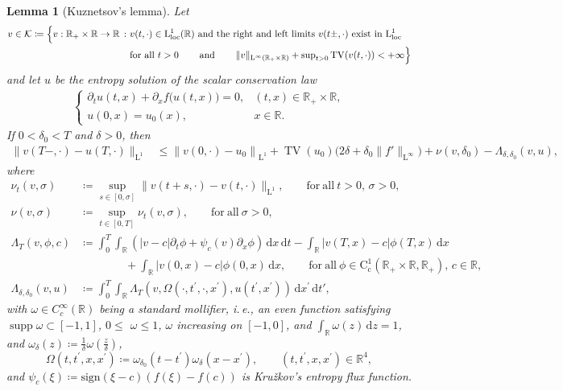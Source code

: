 \documentclass[10pt]{amsart}
\theoremstyle{plain}
\newtheorem{lemma}{Lemma}[section]
\theoremstyle{definition}
\numberwithin{equation}{section}
\newcommand{\R}{\mathbb{R}}
\newcommand{\sgn}[1]{\mathrm{sign}\left(#1\right)}
\newcommand{\pt}{\partial_t}
\newcommand{\px}{\partial_x }
\begin{document}
\begin{lemma}[Kuznetsov's lemma] \label{lm:kut} 
Let 
\begin{align*} v \in \mathcal K \coloneqq \Big\{ v: \R_+\times \R \to \R \, : \ & v(t,\cdot) \in \mathrm{L}^1_{\mathrm{loc}}(\R) \textnormal{ and the right and left limits $v(t \pm, \cdot)$ exist in $\mathrm L^1_{\mathrm{loc}}$} \\ 
&\textnormal{for all $t>0$ \quad\ \, and \quad\ \,  } \|v\|_{\mathrm{L}^\infty(\R_+\times \R)} + \sup\nolimits_{t>0} \mathrm{TV}(v(t,\cdot)) < +\infty\Big\}
\end{align*}
and let $u$ be the entropy solution of the scalar conservation law 
\begin{align}\label{eq:cl-f}
    \begin{cases}
        \pt u(t,x) + \px f\big(u(t,x)\big) = 0, & (t,x) \in \R_+ \times \R, \\
        u(0,x) = u_0(x), & x \in\R.
    \end{cases}
\end{align}
If $0<\delta_0<T$ and $\delta>0$, then
\begin{align*}
\|v(T-,\cdot)-u(T,\cdot)\|_{\mathrm{L}^1} &\leq \left\|v(0,\cdot)-u_0\right\|_{\mathrm{L}^1}+\operatorname{TV}\left(u_0\right)\big(2 \delta+\delta_0\|f'\|_{\mathrm{L}^{\infty}}\big)  +\nu\left(v, \delta_0\right)-\Lambda_{\delta, \delta_0}(v, u),
\end{align*}
where
\begin{align*}
\nu_t(v, \sigma)&\coloneqq \sup_{s\in[0,\sigma]} \|v(t+s,\cdot)-v(t,\cdot)\|_{\mathrm{L}^1}, \qquad \mathrm{for\ all}\ t>0,\,\sigma>0, \\ 
\nu(v, \sigma)&\coloneqq \sup _{t \in[0, T]} \nu_t(v, \sigma), \qquad \mathrm{for\ all}\ \sigma>0, \\
\Lambda_T(v, \phi, c)&\coloneqq  \int_0^T \int_{\mathbb{R}}\left(|v-c| \partial_t \phi+\psi_c(v) \partial_x \phi\right) \, \mathrm d x \, \mathrm d t -\int_{\mathbb{R}}|v(T,x)-c| \phi(T,x) \, \mathrm  d x \\
& \qquad\qquad +\int_{\mathbb{R}}|v(0,x)-c| \phi(0,x) \, \mathrm d x, \qquad \mathrm{for\ all}\ \phi \in \mathrm{C}_\mathrm{c}^1(\mathbb{R}_+\times\mathbb{R},\mathbb{R}_+) ,\, c\in\R, \\
\Lambda_{\delta, \delta_0}(v, u)&\coloneqq  \int_0^T \int_{\mathbb{R}} \Lambda_T\left(v, \Omega\left(\cdot, t^{\prime}, \cdot, x^{\prime}\right), u\left(t^{\prime},x^{\prime}\right)\right) \, \mathrm d x^{\prime} \, \mathrm d t', 
\end{align*}
with  $\omega \in C_c^{\infty}(\mathbb{R})$ being a standard mollifier, i.\,e., an even function satisfying $\operatorname{supp} \omega \subset[-1,1]$, $0 \leq$ $\omega \leq 1$, $\omega$ increasing on $[-1,0]$, and $\int_{\mathbb{R}} \omega(z) \, \mathrm  d z=1$, and $\omega_{\delta}(z)\coloneqq\frac{1}{\delta} \omega\left(\frac{z}{\delta}\right)$, 
$$
\Omega\left(t, t^{\prime},x, x^{\prime}\right)\coloneqq\omega_{\delta_0}\left(t-t^{\prime}\right) \omega_{\delta}\left(x-x^{\prime}\right), \qquad\left(t, t^{\prime},x, x^{\prime}\right) \in \mathbb{R}^4,
$$
and $\psi_c(\xi)\coloneqq\sgn{\xi-c}(f(\xi)-f(c))$ is Kru\v{z}kov's entropy flux function.
\end{lemma}
\end{document}

